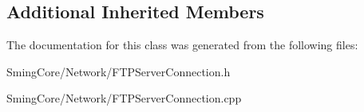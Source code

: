 \subsection*{Additional Inherited Members}


The documentation for this class was generated from the following files\+:\begin{DoxyCompactItemize}
\item 
Sming\+Core/\+Network/F\+T\+P\+Server\+Connection.\+h\item 
Sming\+Core/\+Network/F\+T\+P\+Server\+Connection.\+cpp\end{DoxyCompactItemize}

